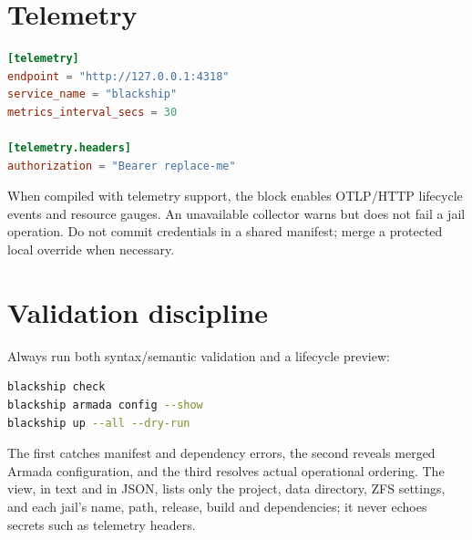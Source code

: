 \section{Telemetry}

\begin{lstlisting}[language=TOML]
[telemetry]
endpoint = "http://127.0.0.1:4318"
service_name = "blackship"
metrics_interval_secs = 30

[telemetry.headers]
authorization = "Bearer replace-me"
\end{lstlisting}

When compiled with telemetry support, the block enables OTLP/HTTP lifecycle
events and resource gauges. An unavailable collector warns but does not fail a
jail operation. Do not commit credentials in a shared manifest; merge a
protected local override when necessary.

\section{Validation discipline}

Always run both syntax/semantic validation and a lifecycle preview:

\begin{lstlisting}[language=bash]
blackship check
blackship armada config --show
blackship up --all --dry-run
\end{lstlisting}

The first catches manifest and dependency errors, the second reveals merged
Armada configuration, and the third resolves actual operational ordering.
The  view, in text and in JSON, lists only the project, data
directory, ZFS settings, and each jail's name, path, release, build and
dependencies; it never echoes secrets such as telemetry headers.
